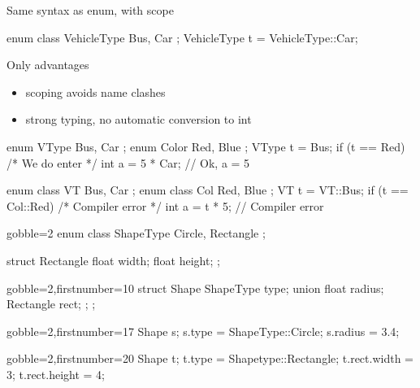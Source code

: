 \begin{frame}[fragile]
  \begin{block}{Same syntax as enum, with scope}
    \begin{cppcode*}{}
      enum class VehicleType { Bus, Car };
      VehicleType t = VehicleType::Car;
    \end{cppcode*}
  \end{block}
  \pause
  \begin{exampleblock}{Only advantages}
    \begin{itemize}
    \item scoping avoids name clashes
    \item strong typing, no automatic conversion to int
    \end{itemize}
    \small
    \begin{cppcode*}{}
      enum VType { Bus, Car }; enum Color { Red, Blue };
      VType t = Bus;
      if (t == Red) { /* We do enter */ }
      int a = 5 * Car; // Ok, a = 5

      enum class VT { Bus, Car }; enum class Col { Red, Blue };
      VT t = VT::Bus;
      if (t == Col::Red) { /* Compiler error */ }
      int a = t * 5;       // Compiler error
    \end{cppcode*}
  \end{exampleblock}
\end{frame}

\begin{frame}[fragile]
  \begin{multicols}{2}
    \begin{cppcode*}{gobble=2}
      enum class ShapeType {
        Circle,
        Rectangle
      };

      struct Rectangle {
        float width;
        float height;
      };
    \end{cppcode*}
    \columnbreak
    \pause
    \begin{cppcode*}{gobble=2,firstnumber=10}
      struct Shape {
        ShapeType type;
        union {
          float radius;
          Rectangle rect;
        };
      };
    \end{cppcode*}
  \end{multicols}
  \pause
  \begin{multicols}{2}
    \begin{cppcode*}{gobble=2,firstnumber=17}
      Shape s;
      s.type =
        ShapeType::Circle;
      s.radius = 3.4;

    \end{cppcode*}
    \columnbreak
    \begin{cppcode*}{gobble=2,firstnumber=20}
      Shape t;
      t.type =
        Shapetype::Rectangle;
      t.rect.width = 3;
      t.rect.height = 4;
    \end{cppcode*}
  \end{multicols}
\end{frame}

